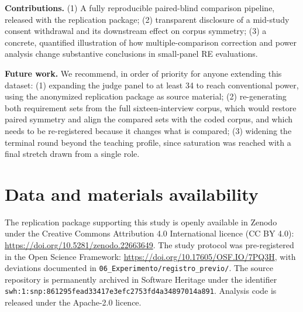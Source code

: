 \documentclass{llncs}
\begin{document}
\textbf{Contributions.} (1) A fully reproducible paired-blind comparison pipeline,
released with the replication package; (2) transparent disclosure of a mid-study
consent withdrawal and its downstream effect on corpus symmetry; (3) a concrete,
quantified illustration of how multiple-comparison correction and power analysis
change substantive conclusions in small-panel RE evaluations.

\textbf{Future work.} We recommend, in order of priority for anyone extending this
dataset: (1) expanding the judge panel to at least 34 to reach conventional power,
using the anonymized replication package as source material; (2) re-generating both
requirement sets from the full sixteen-interview corpus, which would restore paired
symmetry and align the compared sets with the coded corpus, and which needs to be
re-registered because it changes what is compared; (3) widening the terminal round beyond
the teaching profile, since saturation was reached with a final stretch drawn from a
single role.

\section*{Data and materials availability}
{\sloppy
The replication package supporting this study is openly available in Zenodo under the
Creative Commons Attribution 4.0 International licence (CC BY 4.0):
\url{https://doi.org/10.5281/zenodo.22663649}. The study
protocol was pre-registered in the Open Science Framework:
\url{https://doi.org/10.17605/OSF.IO/7PQ3H}, with deviations documented in
\nolinkurl{06_Experimento/registro_previo/}. The source
repository is permanently archived in Software Heritage under the identifier
\texttt{swh:1:snp:861295fead33417e3efc2753fd4a34897014a891}. Analysis code is released under the Apache-2.0 licence.\par}

\end{document}
